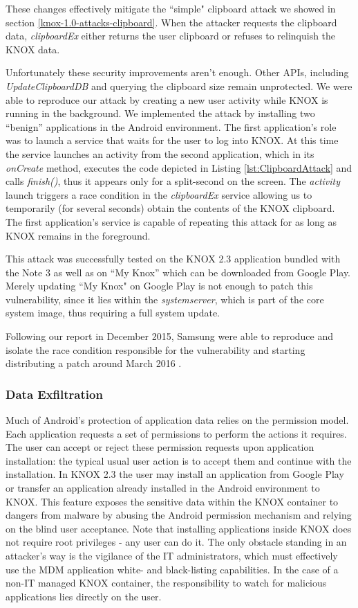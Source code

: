 \documentclass[11pt]{article}
\begin{document}
These changes effectively mitigate the ``simple" clipboard attack we showed in section \ref{knox-1.0-attacks-clipboard}. 
When the attacker requests the clipboard data, \emph{clipboardEx} either returns the user clipboard or refuses to relinquish the KNOX data.

Unfortunately these security improvements aren't enough. Other APIs, including \emph{UpdateClipboardDB} and querying the clipboard size remain unprotected. 
We were able to reproduce our attack by creating a new user activity while KNOX is running in the background. 
We implemented the attack by installing two ``benign'' applications in the Android environment. 
The first application's role was to launch a service that waits for the user to log into KNOX. At this time the service launches an activity from the 
second application, which in its \emph{onCreate} method, executes the code depicted in Listing \ref{lst:ClipboardAttack} and calls \emph{finish()}, 
thus it appears only for a split-second on the screen. 
The \emph{activity} launch triggers a race condition in the \emph{clipboardEx} service allowing us to temporarily (for several seconds)
obtain the contents of the KNOX clipboard. The first application's service is capable of repeating this attack for as long as KNOX remains in the foreground.

This attack was successfully tested on the KNOX 2.3 application bundled with the Note 3 as well as on ``My Knox'' which can be downloaded from Google Play.
Merely updating ``My Knox" on Google Play is not enough to patch this vulnerability, since it lies within the \emph{system\textunderscore server}, 
which is part of the core system image, thus requiring a full system update.

Following our report in December 2015, Samsung were able to reproduce and isolate the race condition responsible for the vulnerability and 
starting distributing a patch around March 2016 \cite{SamsungCorrespondence}.

\subsubsection{Data Exfiltration} \label{knox-2.x-attack-data-exfil}
Much of Android's protection of application data relies on the permission model. Each application requests a set of permissions to perform the actions it
requires. The user can accept or reject these permission requests upon application installation: the typical usual user action is to accept them 
and continue with the installation.
In KNOX 2.3 the user may install an application from Google Play or transfer an application already installed 
in the Android environment to KNOX. This feature exposes the sensitive data within the KNOX container to dangers from
malware by abusing the Android permission mechanism and relying on the blind user acceptance. 
Note that installing applications inside KNOX does not require root privileges - any user can do it.
The only obstacle standing in an attacker's way is the vigilance of the IT administrators, which must effectively use the MDM 
application white- and black-listing capabilities. In the case of a non-IT managed KNOX container, the responsibility to watch for 
malicious applications lies directly on the user. 
\end{document}
